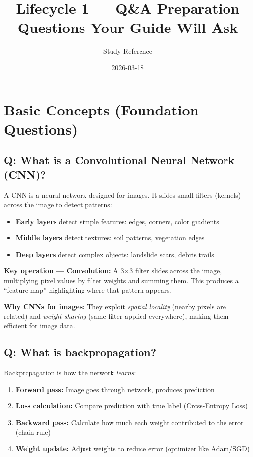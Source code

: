 \documentclass[11pt]{article}
\title{Lifecycle 1 --- Q\&A Preparation \\ \large Questions Your Guide Will Ask}
\author{Study Reference}
\date{2026-03-18}
\begin{document}
\maketitle

\tableofcontents
\newpage

\section{Basic Concepts (Foundation Questions)}

\subsection{Q: What is a Convolutional Neural Network (CNN)?}

A CNN is a neural network designed for images. It slides small filters (kernels) across the image to detect patterns:

\begin{itemize}[noitemsep]
    \item \textbf{Early layers} detect simple features: edges, corners, color gradients
    \item \textbf{Middle layers} detect textures: soil patterns, vegetation edges
    \item \textbf{Deep layers} detect complex objects: landslide scars, debris trails
\end{itemize}

\textbf{Key operation --- Convolution:} A 3$\times$3 filter slides across the image, multiplying pixel values by filter weights and summing them. This produces a ``feature map'' highlighting where that pattern appears.

\textbf{Why CNNs for images:} They exploit \textit{spatial locality} (nearby pixels are related) and \textit{weight sharing} (same filter applied everywhere), making them efficient for image data.

\subsection{Q: What is backpropagation?}

Backpropagation is how the network \textit{learns}:

\begin{enumerate}[noitemsep]
    \item \textbf{Forward pass:} Image goes through network, produces prediction
    \item \textbf{Loss calculation:} Compare prediction with true label (Cross-Entropy Loss)
    \item \textbf{Backward pass:} Calculate how much each weight contributed to the error (chain rule)
    \item \textbf{Weight update:} Adjust weights to reduce error (optimizer like Adam/SGD)
\end{enumerate}
\end{document}
